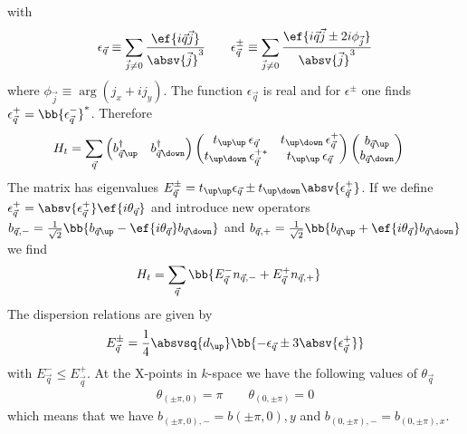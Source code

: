 with
\begin{align*}
\epsilon_{\vec{q}}\equiv \sum_{\vec{j}\ne 0} \frac{\ef{i\vec{q}\vec{j}}}{\absv{\vec{j}}^3}\qquad \epsilon_{\vec{q}}^{\pm}\equiv \sum_{\vec{j}\ne 0} \frac{\ef{i\vec{q}\vec{j}\pm 2i \phi_{\vec{j}}}}{\absv{\vec{j}}^3}
\end{align*}
where $\phi_{\vec{j}}\equiv \mathop{\text{arg}}(j_x + i j_y)$. The function $\epsilon_{\vec{q}}$ is real and for $\epsilon^\pm$ one finds $\epsilon_{\vec{q}}^{+} = \bb{\epsilon_{\vec{q}}^{-}}^*$. Therefore
\begin{align*}
H_t&=\sum_{\vec{q}}  \begin{pmatrix} b^\dagger_{\vec{q}\up} & b^\dagger_{\vec{q}\down}\end{pmatrix} \begin{pmatrix} t_{\up\up}\,\epsilon_{\vec{q}} & t_{\up\down}\,\epsilon_{\vec{q}}^+ \\ t_{\up\down}\,\epsilon_{\vec{q}}^{+*} & t_{\up\up}\,\epsilon_{\vec{q}} \end{pmatrix}  \begin{pmatrix} b_{\vec{q}\up} \\ b_{\vec{q}\down}\end{pmatrix}
\end{align*}
The matrix has eigenvalues $E^\pm_{\vec{q}}=t_{\up\up}\epsilon_{\vec{q}}\pm t_{\up\down}\absv{\epsilon_{\vec{q}}^+}$. If we define $\epsilon_{\vec{q}}^+=\absv{\epsilon_{\vec{q}}^+}\ef{i\theta_{\vec{q}}}$ and introduce new operators $b_{\vec{q},-}=\frac{1}{\sqrt{2}}\bb{b_{\vec{q}\up}-\ef{i\theta_{\vec{q}}} b_{\vec{q}\down}}$ and $b_{\vec{q},+}=\frac{1}{\sqrt{2}}\bb{b_{\vec{q}\up}+\ef{i\theta_{\vec{q}}} b_{\vec{q}\down}}$ we find
\begin{align*}
H_t&=\sum_{\vec{q}} \bb{E^-_{\vec{q}} n_{\vec{q},-} +E^+_{\vec{q}} n_{\vec{q},+} }
\end{align*}
The dispersion relations are given by
\begin{align*}
E^\pm_{\vec{q}}=\frac{1}{4}\absvsq{d_\up}\bb{-\epsilon_{\vec{q}}\pm3\absv{\epsilon_{\vec{q}}^+}}
\end{align*}
with $E^-_{\vec{q}} \le E^+_{\vec{q}}$. At the X-points in $k$-space we have the following values of $\theta_{\vec{q}}$
\begin{align*}
\theta_{(\pm\pi,0)}=\pi \qquad \theta_{(0,\pm\pi)}=0
\end{align*}
which means that we have $b_{(\pm\pi,0),-}=b{(\pm\pi,0),y}$ and $b_{(0,\pm\pi),-}=b_{(0,\pm\pi),x}$.

